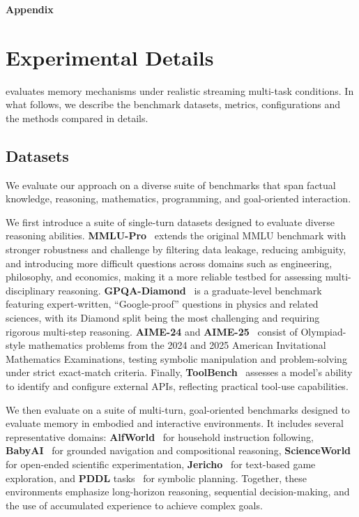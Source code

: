 \newpage
\clearpage
\appendix
\textbf{\Large Appendix}


\tableofcontents
\clearpage
\section{Experimental Details}
\label{appendix:setup}

\method evaluates memory mechanisms under realistic streaming multi-task conditions. In what follows, we describe the benchmark datasets, metrics, configurations and the methods compared in details.


\subsection{Datasets}
We evaluate our approach on a diverse suite of benchmarks that span factual knowledge, reasoning, mathematics, programming, and goal-oriented interaction.

We first introduce a suite of single-turn datasets designed to evaluate diverse reasoning abilities. \textbf{MMLU-Pro}~\citep{zheng2024mmlu} extends the original MMLU benchmark with stronger robustness and challenge by filtering data leakage, reducing ambiguity, and introducing more difficult questions across domains such as engineering, philosophy, and economics, making it a more reliable testbed for assessing multi-disciplinary reasoning. \textbf{GPQA-Diamond}~\citep{rein2023gpqa} is a graduate-level benchmark featuring expert-written, ``Google-proof'' questions in physics and related sciences, with its Diamond split being the most challenging and requiring rigorous multi-step reasoning. \textbf{AIME-24} and \textbf{AIME-25}~\citep{aime2024,aime2025} consist of Olympiad-style mathematics problems from the 2024 and 2025 American Invitational Mathematics Examinations, testing symbolic manipulation and problem-solving under strict exact-match criteria. Finally, \textbf{ToolBench}~\citep{patil2023gorilla} assesses a model’s ability to identify and configure external APIs, reflecting practical tool-use capabilities.


We then evaluate on a suite of multi-turn, goal-oriented benchmarks designed to evaluate memory in embodied and interactive environments. It includes several representative domains:
\textbf{AlfWorld}~\citep{shridhar2021alfworld} for household instruction following, 
\textbf{BabyAI}~\citep{chevalier2018babyai} for grounded navigation and compositional reasoning,
\textbf{ScienceWorld}~\citep{wang2022scienceworld} for open-ended scientific experimentation, 
\textbf{Jericho}~\citep{hausknecht2019interactive} for text-based game exploration, 
and \textbf{PDDL} tasks~\citep{yang2023pddlbench} for symbolic planning. 
Together, these environments emphasize long-horizon reasoning, sequential decision-making, and the use of accumulated experience to achieve complex goals.

